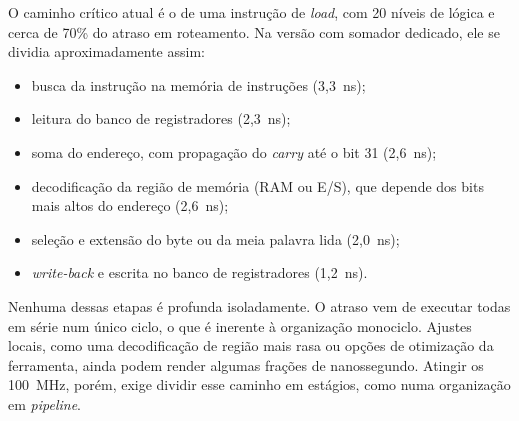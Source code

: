 O caminho crítico atual é o de uma instrução de \textit{load}, com 20 níveis
de lógica e cerca de 70\% do atraso em roteamento. Na versão com somador
dedicado, ele se dividia aproximadamente assim:
\begin{itemize}
  \item busca da instrução na memória de instruções (3,3~ns);
  \item leitura do banco de registradores (2,3~ns);
  \item soma do endereço, com propagação do \textit{carry} até o bit 31
    (2,6~ns);
  \item decodificação da região de memória (RAM ou E/S), que depende dos bits
    mais altos do endereço (2,6~ns);
  \item seleção e extensão do byte ou da meia palavra lida (2,0~ns);
  \item \textit{write-back} e escrita no banco de registradores (1,2~ns).
\end{itemize}

Nenhuma dessas etapas é profunda isoladamente. O atraso vem de executar
todas em série num único ciclo, o que é inerente à organização monociclo.
Ajustes locais, como uma decodificação de região mais rasa ou opções de
otimização da ferramenta, ainda podem render algumas frações de
nanossegundo. Atingir os 100~MHz, porém, exige dividir esse caminho em
estágios, como numa organização em \textit{pipeline}.
